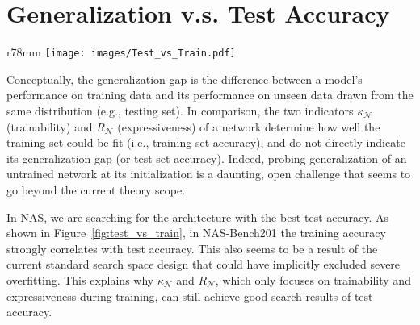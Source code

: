 \documentclass{article} \usepackage{iclr2021_conference,times}
\begin{document}
\section{Generalization v.s. Test Accuracy}

\begin{wrapfigure}{r}{78mm}
\vspace{-2.5em}
\texttt{[image: images/Test\_vs\_Train.pdf]}
\centering
\vspace{-1em}
\caption{The correlation between test accuracy and the training accuracy in NAS-Bench201 \citep{dong2020bench}.}
\label{fig:test_vs_train}
\vspace{-1em}
\end{wrapfigure}


Conceptually, the generalization gap is the difference between a model’s performance on training data and its performance on unseen data drawn from the same distribution (e.g., testing set). In comparison, the two indicators $\kappa_\mathcal{N}$ (trainability) and $R_\mathcal{N}$ (expressiveness) of a network determine how well the training set could be fit (i.e., training set accuracy), and do not directly indicate its generalization gap (or test set accuracy). Indeed, probing generalization of an untrained network at its initialization is a daunting, open challenge that seems to go beyond the current theory scope. 

In NAS, we are searching for the architecture with the best test accuracy. As shown in Figure~\ref{fig:test_vs_train}, in NAS-Bench201 the training accuracy strongly correlates with test accuracy. This also seems to be a result of the current standard search space design that could have implicitly excluded severe overfitting. This explains why $\kappa_\mathcal{N}$ and $R_\mathcal{N}$, which only focuses on trainability and expressiveness during training, can still achieve good search results of test accuracy.
\end{document}
